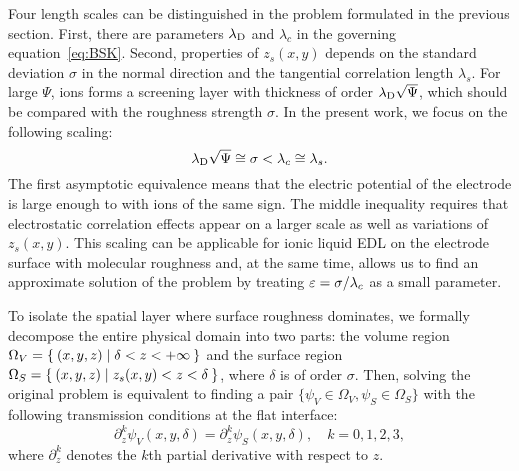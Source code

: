 Four length scales can be distinguished in the problem formulated in the previous section. First, there are parameters $\lambda_\text{D}$ and $\lambda_c$ in the governing equation~\eqref{eq:BSK}. Second, properties of $z_s(x,y)$ depends on the standard deviation $\sigma$ in the normal direction and the tangential correlation length $\lambda_s$. For large $\Psi$, ions forms a screening layer with thickness of order $\lambda_\text{D}\sqrt{\Psi}$, which should be compared with the roughness strength $\sigma$. In the present work, we focus on the following scaling:
\begin{equation}\label{eq:scaling}
    \lambda_\text{D}\sqrt{\Psi}\cong\sigma<\lambda_c\cong\lambda_s.
\end{equation}
The first asymptotic equivalence means that the electric potential of the electrode is large enough to  with ions of the same sign. The middle inequality requires that electrostatic correlation effects appear on a larger scale as well as variations of $z_s(x,y)$. This scaling can be applicable for ionic liquid EDL on the electrode surface with molecular roughness and, at the same time, allows us to find an approximate solution of the problem by treating $\varepsilon=\sigma/\lambda_c$ as a small parameter.

To isolate the spatial layer where surface roughness dominates, we formally decompose the entire physical domain into two parts: the volume region $\Omega_V=\Set{(x,y,z) | \delta<z<+\infty}$ and the surface region $\Omega_S=\Set{(x,y,z) | z_s(x,y)<z<\delta}$, where $\delta$ is of order $\sigma$.
Then, solving the original problem is equivalent to finding a pair $\{\psi_V\in\Omega_V,\psi_S\in\Omega_S\}$ with the following transmission conditions at the flat interface:
\begin{equation}\label{eq:interface}
    \partial_z^k\psi_V(x,y,\delta) = \partial_z^k\psi_S(x,y,\delta), \quad k = 0,1,2,3,
\end{equation}
where $\partial_z^k$ denotes the $k$th partial derivative with respect to $z$.

